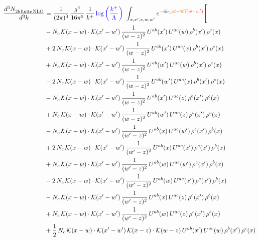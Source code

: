 \documentclass[9pt]{article}
\numberwithin{equation}{section}
\begin{document}
\begin{align}
    \frac{d^{3}N_{2b\,\rm finite\, NLO}^{\rm}}{d^{3}k} & = \frac{1}{(2\pi)^{3}}\,\frac{g^{4}}{16\pi^{5}}\,\frac{1}{k^{+}}\,{\color{blue}\log{\left(\frac{k^{+}}{\Lambda}\right)}}\,\,\int_{x,x',z,w,w'}e^{-ik\cdot{\color{orange}\cancel{(w'-w)}}{\color{red}(w-w')}}\Bigg[\notag\\ & -N_{c}\,\mathcal{K}(x-w)\cdot\mathcal{K}(x'-w')\,\frac{1}{(w-z)^{2}}\,U^{ab}(x')\,U^{ac}(w)\,\rho^{b}(x')\,\rho^{c}(x)\notag\\
&+2\,N_{c}\,\mathcal{K}(x-w)\cdot\mathcal{K}(x'-w')\,\frac{1}{(w-z)^{2}}\,U^{ab}(x')\,U^{ac}(x)\,\rho^{b}(x')\,\rho^{c}(x)\notag\\
&+N_{c}\,\mathcal{K}(x-w)\cdot\mathcal{K}(x'-w')\,\frac{1}{(w-z)^{2}}\,U^{ab}(w')\,U^{ac}(w)\,\rho^{b}(x')\,\rho^{c}(x)\notag\\
&-2\,N_{c}\,\mathcal{K}(x-w)\cdot\mathcal{K}(x'-w')\,\frac{1}{(w-z)^{2}}\,U^{ab}(w')\,U^{ac}(x)\,\rho^{b}(x')\,\rho^{c}(x)\notag\\
&-N_{c}\,\mathcal{K}(x-w)\cdot\mathcal{K}(x'-w')\,\frac{1}{(w-z)^{2}}\,U^{ab}(x')\,U^{ac}(z)\,\rho^{b}(x')\,\rho^{c}(x)\notag\\
&+N_{c}\,\mathcal{K}(x-w)\cdot\mathcal{K}(x'-w')\,\frac{1}{(w-z)^{2}}\,U^{ab}(w')\,U^{ac}(z)\,\rho^{b}(x')\,\rho^{c}(x)\notag\\
&-N_{c}\,\mathcal{K}(x-w)\cdot\mathcal{K}(x'-w')\,\frac{1}{(w'-z)^{2}}\,U^{ab}(x)\,U^{ac}(w')\,\rho^{c}(x')\,\rho^{b}(x)\notag\\
&+2\,N_{c}\,\mathcal{K}(x-w)\cdot\mathcal{K}(x'-w')\,\frac{1}{(w'-z)^{2}}\,U^{ab}(x)\,U^{ac}(x')\,\rho^{c}(x')\,\rho^{b}(x)\notag\\
&+N_{c}\,\mathcal{K}(x-w)\cdot\mathcal{K}(x'-w')\,\frac{1}{(w'-z)^{2}}\,U^{ab}(w)\,U^{ac}(w')\,\rho^{c}(x')\,\rho^{b}(x)\notag\\
&-2\,N_{c}\,\mathcal{K}(x-w)\cdot\mathcal{K}(x'-w')\,\frac{1}{(w'-z)^{2}}\,U^{ab}(w)\,U^{ac}(x')\,\rho^{c}(x')\,\rho^{b}(x)\notag\\
&-N_{c}\,\mathcal{K}(x-w)\cdot\mathcal{K}(x'-w')\,\frac{1}{(w'-z)^{2}}\,U^{ab}(x)\,U^{ac}(z)\,\rho^{c}(x')\,\rho^{b}(x)\notag\\
&+N_{c}\,\mathcal{K}(x-w)\cdot\mathcal{K}(x'-w')\,\frac{1}{(w'-z)^{2}}\,U^{ab}(w)\,U^{ac}(z)\,\rho^{c}(x')\,\rho^{b}(x)\notag\\
&+\frac{1}{2}\,N_{c}\,\mathcal{K}(x-w)\cdot\mathcal{K}(x'-w')\,\mathcal{K}(x-z)\cdot\mathcal{K}(w-z)\,U^{ab}(x')\,U^{ac}(w)\,\rho^{b}(x')\,\rho^{c}(x)\notag\\

\end{align}
\end{document}
